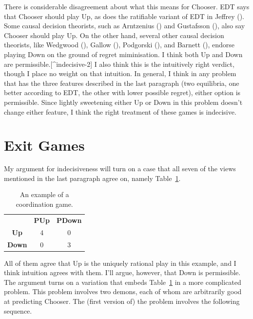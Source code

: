 \documentclass[
  12pt,
  letterpaper,
  DIV=11,
  numbers=noendperiod]{scrreprt}
\begin{document}
There is considerable disagreement about what this means for Chooser.
EDT says that Chooser should play Up, as does the ratifiable variant of
EDT in Jeffrey (). Some causal decision
theorists, such as Arntzenius () and
Gustafsson (), also say Chooser
should play Up. On the other hand, several other causal decision
theorists, like Wedgwood (), Gallow
(), Podgorski
(), and Barnett
(), endorse playing Down on the ground
of regret miminisation. I think both Up and Down are
permissible.{[}\^{}indecisive-2{]} I also think this is the intuitively
right verdict, though I place no weight on that intuition. In general, I
think in any problem that has the three features described in the last
paragraph (two equilibria, one better according to EDT, the other with
lower possible regret), either option is permissible. Since lightly
sweetening either Up or Down in this problem doesn't change either
feature, I think the right treatment of these games is indecisive.

\section{Exit Games}\label{sec-exit-games}

My argument for indecisiveness will turn on a case that all seven of the
views mentioned in the last paragraph agree on, namely
Table~\ref{tbl-coord}.

\begin{longtable}[]{@{}ccc@{}}
\caption{An example of a coordination
game.}\label{tbl-coord}\tabularnewline
\toprule\noalign{}
\endfirsthead
\endhead
\bottomrule\noalign{}
\endlastfoot
& \textbf{PUp} & \textbf{PDown} \\
\textbf{Up} & 4 & 0 \\
\textbf{Down} & 0 & 3 \\
\end{longtable}

All of them agree that Up is the uniquely rational play in this example,
and I think intuition agrees with them. I'll argue, however, that Down
is permissible. The argument turns on a variation that embeds
Table~\ref{tbl-coord} in a more complicated problem. This problem
involves two demons, each of whom are arbitrarily good at predicting
Chooser. The (first version of) the problem involves the following
sequence.
\end{document}

